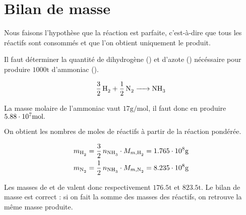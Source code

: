 \section{Bilan de masse} 

Nous faisons l'hypothèse que la réaction est parfaite, 
c'est-à-dire que tous les réactifs sont consommés 
et que l'on obtient uniquement le produit.

Il faut déterminer la quantité de dihydrogène () et d'azote () 
nécéssaire pour produire $1000 \si{\tonne}$ d'ammoniac ().

\begin{equation}
	\ce{\frac{3}{2} \, H2 + \frac{1}{2} \, N2 -> NH3} 
	\label{eq:ammoniac}
\end{equation}

La masse molaire de l'ammoniac vaut $17 \si{\gram\per\mole}$,
il faut donc en produire $5.88\cdot 10^{7} \si{\mole}.$

On obtient les nombres de moles de réactifs à partir de la réaction pondérée. 

\begin{align*}
	m_{\ce{H2}}  = \frac{3}{2} \, n_{\ce{NH3}} \cdot M_{m, \ce{H2}} 
	= 1.765\e{8} \si{\gram} \\
	m_{\ce{N2}} = \frac{1}{2} \, n_{\ce{NH3}} \cdot M_{m, \ce{N2}} 
	= 8.235\e{8} \si{\gram}
\end{align*}

Les masses de  et de  valent donc 
respectivement $176.5 \si{\tonne}$ et $823.5 \si{\tonne}$.
Le bilan de masse est correct : si on fait la somme des masses des réactifs,
on retrouve la même masse produite.
